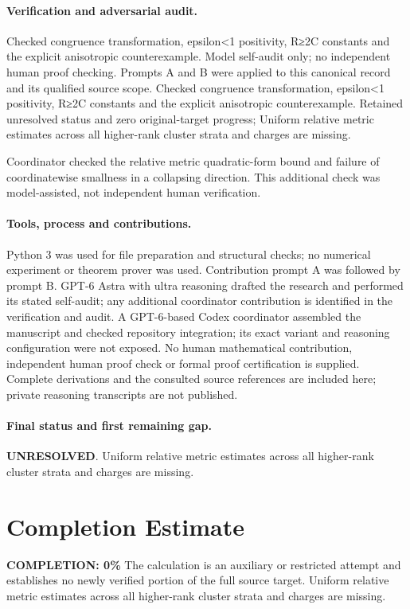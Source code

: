 \documentclass[11pt]{article}
\begin{document}
\paragraph{Verification and adversarial audit.}
Checked congruence transformation, epsilon<1 positivity, R≥2C constants and the explicit anisotropic counterexample. Model self-audit only; no independent human proof checking. Prompts A and B were applied to this canonical record and its qualified source scope. Checked congruence transformation, epsilon<1 positivity, R≥2C constants and the explicit anisotropic counterexample. Retained unresolved status and zero original-target progress; Uniform relative metric estimates across all higher-rank cluster strata and charges are missing.

Coordinator checked the relative metric quadratic-form bound and failure of coordinatewise smallness in a collapsing direction. This additional check was model-assisted, not independent human verification.

\paragraph{Tools, process and contributions.}
Python 3 was used for file preparation and structural checks; no numerical experiment or theorem prover was used. Contribution prompt A was followed by prompt B. GPT-6 Astra with ultra reasoning drafted the research and performed its stated self-audit; any additional coordinator contribution is identified in the verification and audit. A GPT-6-based Codex coordinator assembled the manuscript and checked repository integration; its exact variant and reasoning configuration were not exposed. No human mathematical contribution, independent human proof check or formal proof certification is supplied. Complete derivations and the consulted source references are included here; private reasoning transcripts are not published.

\paragraph{Final status and first remaining gap.}
\textbf{UNRESOLVED}. Uniform relative metric estimates across all higher-rank cluster strata and charges are missing.

\section{Completion Estimate}
\noindent\textbf{COMPLETION: 0\%}
The calculation is an auxiliary or restricted attempt and establishes no newly verified portion of the full source target. Uniform relative metric estimates across all higher-rank cluster strata and charges are missing.
\end{document}
